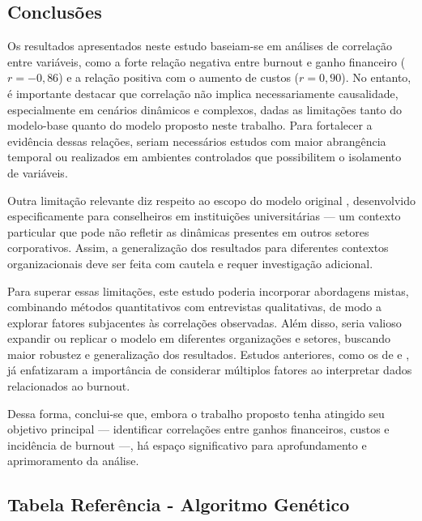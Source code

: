 \documentclass[
	article,			%
	11pt,				%
	oneside,			%
	a4paper,			%
	english,			%
	brazil,				%
	sumario=tradicional
	]{abntex2}
\begin{document}
\section{Conclusões}
Os resultados apresentados neste estudo baseiam-se em análises de correlação entre variáveis, como a forte relação negativa entre burnout e ganho financeiro (\( r = -0{,}86 \)) e a relação positiva com o aumento de custos (\( r = 0{,}90 \)). No entanto, é importante destacar que correlação não implica necessariamente causalidade, especialmente em cenários dinâmicos e complexos, dadas as limitações tanto do modelo-base \cite{Zhang2020Burnout} quanto do modelo proposto neste trabalho. Para fortalecer a evidência dessas relações, seriam necessários estudos com maior abrangência temporal ou realizados em ambientes controlados que possibilitem o isolamento de variáveis.

Outra limitação relevante diz respeito ao escopo do modelo original \cite{Zhang2020Burnout}, desenvolvido especificamente para conselheiros em instituições universitárias — um contexto particular que pode não refletir as dinâmicas presentes em outros setores corporativos. Assim, a generalização dos resultados para diferentes contextos organizacionais deve ser feita com cautela e requer investigação adicional.

Para superar essas limitações, este estudo poderia incorporar abordagens mistas, combinando métodos quantitativos com entrevistas qualitativas, de modo a explorar fatores subjacentes às correlações observadas. Além disso, seria valioso expandir ou replicar o modelo em diferentes organizações e setores, buscando maior robustez e generalização dos resultados. Estudos anteriores, como os de  e , já enfatizaram a importância de considerar múltiplos fatores ao interpretar dados relacionados ao burnout.

Dessa forma, conclui-se que, embora o trabalho proposto tenha atingido seu objetivo principal — identificar correlações entre ganhos financeiros, custos e incidência de burnout —, há espaço significativo para aprofundamento e aprimoramento da análise.



\newpage
\begin{apendices}

\chapter{Tabela Referência - Algoritmo Genético}


\end{apendices}

\newpage


\end{document}
